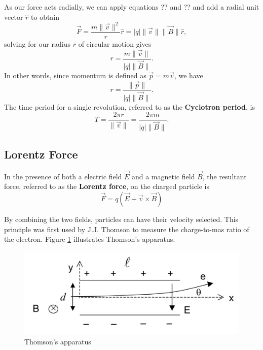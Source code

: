 As our force acts radially, we can apply equations ?? and ?? and add a radial unit vector $\hat{r}$ to obtain
\begin{equation}
    \vec{F} = \frac{m \| \vec{v} \|^2}{r} \hat{r} = |q| \| \vec{v} \| \|\vec{B}\| \hat{r},
\end{equation}
solving for our radius $r$ of circular motion gives
\begin{equation}
    r = \frac{m \| \vec{v} \|}{|q| \| \vec{B} \|}.
\end{equation}
In other words, since momentum is defined as $\vec{p} = m \vec{v}$, we have
\begin{equation}
    r = \frac{\| \vec{p} \|}{|q| \| \vec{B} \|}.
\end{equation}
The time period for a single revolution, referred to as the \textbf{Cyclotron period}, is
\begin{equation}
    T = \frac{2\pi r}{\| \vec{v} \|} = \frac{2\pi m}{|q| \| \vec{B} \|}.
\end{equation}
    
\subsection{Lorentz Force}

In the presence of both a electric field $\vec{E}$ and a magnetic field $\vec{B}$, the resultant force, referred to as the \textbf{Lorentz force}, on the charged particle is
\begin{equation}
    \vec{F} = q(\vec{E} + \vec{v} \times \vec{B})
\end{equation}

By combining the two fields, particles can have their velocity selected. This principle was first used by J.J. Thomson to measure the charge-to-mas ratio of the electron. Figure \ref{fig:lorentz-force} illustrates Thomson's apparatus.

\begin{figure}[h!]
    \centering
    \includegraphics[scale=0.75]{notes/images/Lorentz-Force.JPG}
    \caption{Thomson's apparatus}
    \label{fig:lorentz-force}
\end{figure}
\FloatBarrier

